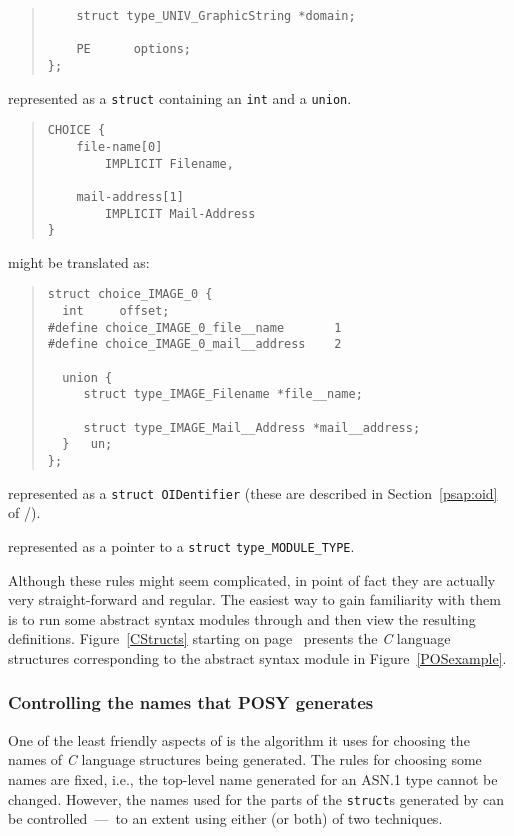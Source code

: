 \begin{describe}
\begin{quote}
\begin{verbatim}
    struct type_UNIV_GraphicString *domain;

    PE      options;
};
\end{verbatim}\end{quote}

\item	[\verb"CHOICE":] represented as a \verb"struct" containing an
\verb"int" and a \verb"union".
\begin{quote}\small\begin{verbatim}
CHOICE {
    file-name[0]
        IMPLICIT Filename,

    mail-address[1]
        IMPLICIT Mail-Address
}
\end{verbatim}\end{quote}
might be translated as:
\begin{quote}\small\begin{verbatim}
struct choice_IMAGE_0 {
  int     offset;
#define choice_IMAGE_0_file__name       1
#define choice_IMAGE_0_mail__address    2

  union {
     struct type_IMAGE_Filename *file__name;

     struct type_IMAGE_Mail__Address *mail__address;
  }   un;
};
\end{verbatim}\end{quote}

\item	[\verb"OBJECT IDENTIFIER":] represented as a \verb"struct OIDentifier"
	(these are described in Section~\ref{psap:oid} of \volone/).

\item	[\verb"MODULE.TYPE":] represented as a pointer to a
	\verb"struct" \verb"type_MODULE_TYPE".
\end{describe}

Although these rules might seem complicated,
in point of fact they are actually very straight-forward and regular.
The easiest way to gain familiarity with them is to run some abstract syntax
modules through  and then view the resulting definitions.
Figure~\ref{CStructs} starting on page~\pageref{CStructs} presents the
{\em C\/} language structures corresponding to the abstract syntax module in
Figure~\ref{POSexample}.

\subsubsection	{Controlling the names that POSY generates}
One of the least friendly aspects of  is the algorithm
it uses for choosing the names of {\em C\/} language structures being
generated.
The rules for choosing some names are fixed,
i.e., the top-level name generated for an ASN.1 type cannot be changed.
However,
the names used for the parts of the \verb"struct"s generated by  can
be controlled~---~to an extent using either (or both) of two techniques.

